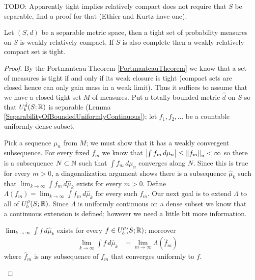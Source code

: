 TODO: Apparently tight implies relatively compact does not require that $S$ be separable, find a proof for that (Ethier and Kurtz have one).

\begin{thm}\label{Prohorov}Let $(S,d)$ be a
  separable metric space, then a tight set of probability measures on
  $S$ is weakly relatively compact.  If $S$ is also complete then a
  weakly relatively compact set is tight.
\end{thm}
\begin{proof}
By the Portmanteau Theorem \ref{PortmanteauTheorem} we know that a
set of measures is tight if and only if its weak closure is tight
(compact sets are closed hence can only gain mass in a weak limit).  Thus it suffices to assume
that we have a closed tight set $M$ of measures.  Put a totally
bounded metric $\hat{d}$ on $S$ so that $U_b^{\hat{d}}(S;\mathbb{R})$ is separable
(Lemma \ref{SeparabilityOfBoundedUniformlyContinuous}); let $f_1, f_2,
\dotsc$ be a countable uniformly dense subset.  

Pick a sequence $\mu_n$ from $M$; we must show that it has a weakly
convergent subsequence.  For every fixed $f_m$
we know that $\left \vert \int f_m \, d\mu_n \right \vert \leq \left \lVert f_m \right \rVert_u < \infty$ so
there is a subsequence $N \subset \mathbb{N}$ such that $\int f_m \,
d\mu_n$ converges along $N$.  Since this is true for every $m>0$, a
diagonalization argument shows there is a subsequence $\hat{\mu}_{k}$ such that
$\lim_{k \to \infty} \int f_m \, d\hat{\mu}_{k}$ exists for every
$m>0$.  Define $\Lambda(f_m) =   \lim_{k \to \infty} \int f_m \,
d\hat{\mu}_{k}$ for every such $f_m$.  Our next goal is to extend
$\Lambda$ to all of $U_b^\rho(S;\mathbb{R})$.  Since $\Lambda$ is
uniformly continuous on a dense subset we know that a continuous
extension is defined; however we need a little bit more information.

\begin{clm}$\lim_{k \to \infty} \int f \, d\hat{\mu}_{k}$ exists for every
$f \in U_b^\rho(S;\mathbb{R})$; moreover 
\begin{align*}
\lim_{k \to \infty} \int f \,d\hat{\mu}_{k} &= \lim_{m \to \infty} \Lambda(\hat{f}_m)
\end{align*} 
where $\hat{f}_m$ is any subsequence of $f_m$ that converges uniformly to $f$.
\end{clm}


\end{proof}
